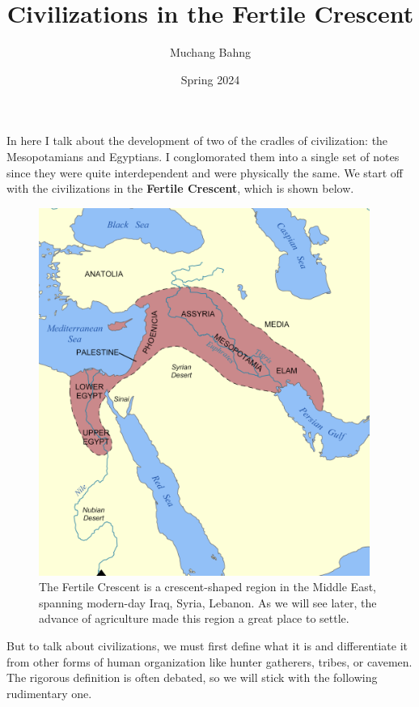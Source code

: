 \documentclass{article}
\begin{document}
\title{Civilizations in the Fertile Crescent}
\author{Muchang Bahng}
\date{Spring 2024}

\maketitle
\tableofcontents
\pagebreak

  In here I talk about the development of two of the cradles of civilization: the Mesopotamians and Egyptians. I conglomorated them into a single set of notes since they were quite interdependent and were physically the same. We start off with the civilizations in the \textbf{Fertile Crescent}, which is shown below. 

  \begin{figure}[H]
    \centering 
    \includegraphics[scale=0.4]{img/fertile_crescent.png}
    \caption{The Fertile Crescent is a crescent-shaped region in the Middle East, spanning modern-day Iraq, Syria, Lebanon. As we will see later, the advance of agriculture made this region a great place to settle. } 
    \label{fig:fertile_crescent}
  \end{figure}

  But to talk about civilizations, we must first define what it is and differentiate it from other forms of human organization like hunter gatherers, tribes, or cavemen. The rigorous definition is often debated, so we will stick with the following rudimentary one. 
\end{document}
